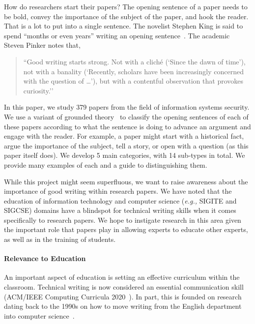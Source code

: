 \documentclass[sigconf,anonymous]{acmart}
\newcommand{\eg}{\textit{e.g.,}\xspace}
\begin{document}
How do researchers start their papers? The opening sentence of a paper needs to be bold, convey the importance of the subject of the paper, and hook the reader. That is a lot to put into a single sentence. The novelist Stephen King is said to spend ``months or even years'' writing an opening sentence~\cite{Fas13}. The academic Steven Pinker notes that,

\begin{quote}
``Good writing starts strong. Not with a cliché (`Since the dawn of time’), not with a banality (`Recently, scholars have been increasingly concerned with the question of …’), but with a contentful observation that provokes curiosity.''~\cite{Pin15}
\end{quote}

In this paper, we study 379 papers from the field of information systems security. We use a variant of grounded theory~\cite{glaser1968discovery} to classify the opening sentences of each of these papers according to what the sentence is doing to advance an argument and engage with the reader. For example, a paper might start with a historical fact, argue the importance of the subject, tell a story, or open with a question (as this paper itself does). We develop 5 main categories, with 14 sub-types in total. We provide many examples of each and a guide to distinguishing them.

While this project might seem superfluous, we want to raise awareness about the importance of good writing within research papers. We have noted that the education of information technology and computer science (\eg SIGITE and SIGCSE) domains have a blindspot for technical writing skills when it comes specifically to research papers. We hope to instigate research in this area given the important role that papers play in allowing experts to educate other experts, as well as in the training of students.
	
\paragraph{Relevance to Education}

An important aspect of education is setting an effective curriculum within the classroom. Technical writing is now considered an essential communication skill (ACM/IEEE Computing Curricula 2020~\cite{CC2020,CC2020report}). In part, this is founded on research dating back to the 1990s on how to move writing from the English department into computer science~\cite{Pes91,TP93,FPC96,Kay98}.
\end{document}
